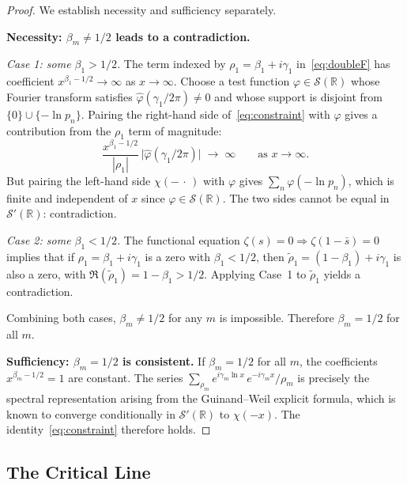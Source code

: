 \documentclass[11pt, oneside]{article}
\theoremstyle{definition}
\begin{document}
\begin{proof}
We establish necessity and sufficiency separately.

\medskip\noindent\textbf{Necessity: $\beta_m \neq 1/2$ leads to
a contradiction.}

\medskip\noindent\emph{Case 1: some $\beta_1 > 1/2$.}
The term indexed by $\rho_1 = \beta_1 + i\gamma_1$
in~\eqref{eq:doubleF} has coefficient
$x^{\beta_1 - 1/2} \to \infty$ as $x \to \infty$.
Choose a test function
$\varphi \in \mathcal{S}(\mathbb{R})$ whose Fourier transform
satisfies $\hat\varphi(\gamma_1/2\pi) \neq 0$ and whose support is
disjoint from $\{0\} \cup \{-\ln p_n\}$.
Pairing the right-hand side of~\eqref{eq:constraint}
with $\varphi$ gives a contribution from the $\rho_1$ term of
magnitude:
\begin{equation}
  \frac{x^{\beta_1-1/2}}{|\rho_1|}\,
  \bigl|\hat\varphi(\gamma_1/2\pi)\bigr|
  \;\longrightarrow\; \infty
  \qquad \text{as } x \to \infty.
\end{equation}
But pairing the left-hand side $\chi(-\,\cdot\,)$ with $\varphi$
gives $\sum_n \varphi(-\ln p_n)$, which is finite and independent
of $x$ since $\varphi \in \mathcal{S}(\mathbb{R})$.
The two sides cannot be equal in $\mathcal{S}'(\mathbb{R})$:
contradiction.

\medskip\noindent\emph{Case 2: some $\beta_1 < 1/2$.}
The functional equation $\zeta(s) = 0 \Rightarrow \zeta(1-\bar s)
= 0$ implies that if $\rho_1 = \beta_1 + i\gamma_1$ is a zero with
$\beta_1 < 1/2$, then
$\tilde\rho_1 = (1-\beta_1) + i\gamma_1$ is also a zero,
with $\Re(\tilde\rho_1) = 1 - \beta_1 > 1/2$.
Applying Case~1 to $\tilde\rho_1$ yields a contradiction.

Combining both cases, $\beta_m \neq 1/2$ for any $m$ is
impossible. Therefore $\beta_m = 1/2$ for all $m$.

\medskip\noindent\textbf{Sufficiency: $\beta_m = 1/2$ is
consistent.}
If $\beta_m = 1/2$ for all $m$, the coefficients
$x^{\beta_m - 1/2} = 1$ are constant.
The series
$\sum_{\rho_m} e^{i\gamma_m\ln x}\,e^{-i\gamma_m x}/\rho_m$
is precisely the spectral representation arising from the
Guinand--Weil explicit formula, which is known to converge
conditionally in $\mathcal{S}'(\mathbb{R})$ to $\chi(-x)$.
The identity~\eqref{eq:constraint} therefore holds.
\end{proof}

\subsection{The Critical Line}
\end{document}
